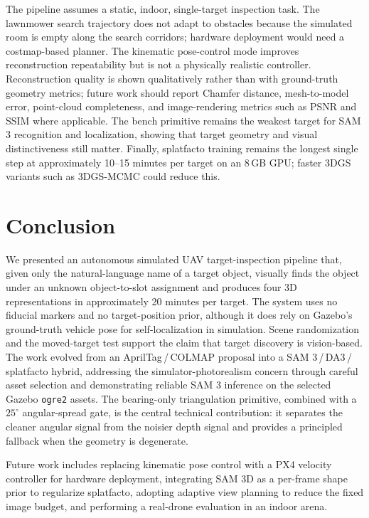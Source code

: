 \documentclass[conference]{IEEEtran}
\begin{document}
The pipeline assumes a static, indoor, single-target inspection
task. The lawnmower search trajectory does not adapt to obstacles
because the simulated room is empty along the search corridors;
hardware deployment would need a costmap-based planner. The
kinematic pose-control mode improves reconstruction repeatability
but is not a physically realistic controller. Reconstruction
quality is shown qualitatively rather than with ground-truth
geometry metrics; future work should report Chamfer distance,
mesh-to-model error, point-cloud completeness, and image-rendering
metrics such as PSNR and SSIM where applicable. The bench primitive
remains the weakest target for SAM 3 recognition and localization,
showing that target geometry and visual distinctiveness still
matter. Finally, splatfacto training remains the longest single
step at approximately 10--15 minutes per target on an 8\,GB GPU;
faster 3DGS variants such as 3DGS-MCMC \cite{kheradmand2024_3dgs_mcmc}
could reduce this.

\section{Conclusion}

We presented an autonomous simulated UAV target-inspection pipeline
that, given only the natural-language name of a target object,
visually finds the object under an unknown object-to-slot assignment
and produces four 3D representations in approximately 20 minutes per
target. The system uses no fiducial markers and no target-position
prior, although it does rely on Gazebo's ground-truth vehicle pose
for self-localization in simulation. Scene randomization and the
moved-target test support the claim that target discovery is
vision-based. The work evolved from an AprilTag\,/\,COLMAP proposal
into a SAM 3\,/\,DA3\,/\,splatfacto hybrid, addressing the
simulator-photorealism concern through careful asset selection and
demonstrating reliable SAM 3 inference on the selected Gazebo
\texttt{ogre2} assets. The bearing-only triangulation primitive,
combined with a $25^{\circ}$ angular-spread gate, is the central
technical contribution: it separates the cleaner angular signal
from the noisier depth signal and provides a principled fallback
when the geometry is degenerate.

Future work includes replacing kinematic pose control with a PX4
velocity controller for hardware deployment, integrating SAM 3D
as a per-frame shape prior to regularize splatfacto, adopting
adaptive view planning to reduce the fixed image budget, and
performing a real-drone evaluation in an indoor arena.
\end{document}
